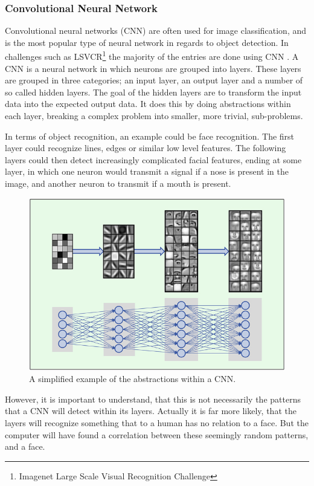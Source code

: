 \subsubsection{Convolutional Neural Network}
Convolutional neural networks (CNN) are often used for image classification, and is the most popular type of neural network in regards to object detection\cite{CNN}.
In challenges such as LSVCR\footnote{Imagenet Large Scale Visual Recognition Challenge} the majority of the entries are done using CNN \cite{ILSVRC_Results}.  
A CNN is a neural network in which neurons are grouped into layers.
These layers are grouped in three categories; an input layer, an output layer and a number of so called hidden layers.
The goal of the hidden layers are to transform the input data into the expected output data.
It does this by doing abstractions within each layer, breaking a complex problem into smaller, more trivial, sub-problems.

In terms of object recognition, an example could be face recognition.
The first layer could recognize lines, edges or similar low level features.
The following layers could then detect increasingly complicated facial features, ending at some layer, in which one neuron would transmit a signal if a nose is present in the image, and another neuron to transmit if a mouth is present.


\begin{figure}[H]
	\centering
	\includegraphics[scale=0.40]{images/cnn_face.jpg}
	\caption{
		A simplified example of the abstractions within a CNN.
	}
	\label{fig:face_cnn}
\end{figure}
 
However, it is important to understand, that this is not necessarily the patterns that a CNN will detect within its layers.
Actually it is far more likely, that the layers will recognize something that to a human has no relation to a face.
But the computer will have found a correlation between these seemingly random patterns, and a face.

